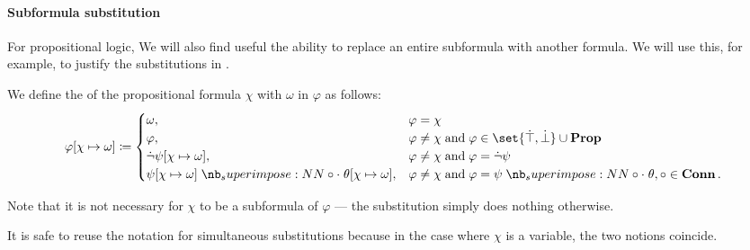 \paragraph{Subformula substitution}

For propositional logic, We will also find useful the ability to replace an entire subformula with another formula. We will use this, for example, to justify the substitutions in .

\begin{definition}\label{def:propositional_subformula_substitution}
  We define the  of the propositional formula \( \chi \) with \( \omega \) in \( \varphi \) as follows:
  \begin{equation}\label{eq:def:propositional_subformula_substitution}
    \varphi[\chi \mapsto \omega] \coloneqq \begin{cases}
      \omega,                                                         &\varphi = \chi \\
      \varphi,                                                        &\varphi \neq \chi \T{and} \varphi \in \set{ \syntop, \synbot } \cup \op*{Prop} \\
      \synneg \psi[\chi \mapsto \omega],                              &\varphi \neq \chi \T{and} \varphi = \synneg \psi \\
      \psi[\chi \mapsto \omega] \syncirc \theta[\chi \mapsto \omega], &\varphi \neq \chi \T{and} \varphi = \psi \syncirc \theta, \circ \in \op*{Conn}.
    \end{cases}
  \end{equation}
\end{definition}
\begin{comments}
  \item Note that it is not necessary for \( \chi \) to be a subformula of \( \varphi \) --- the substitution simply does nothing otherwise.
  \item It is safe to reuse the notation for simultaneous substitutions because in the case where \( \chi \) is a variable, the two notions coincide.
\end{comments}

